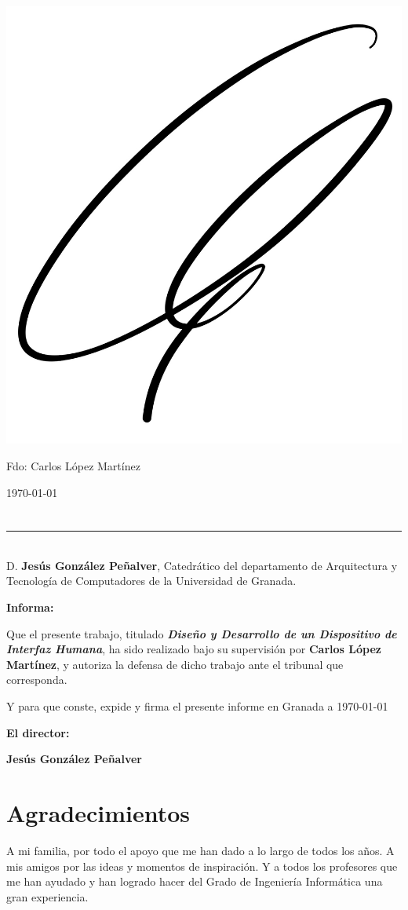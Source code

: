 \vspace{3cm}

\begin{flushleft}
       \hspace*{1.25cm}\includegraphics[width=0.2\linewidth]{prefacios/Firma.jpg}
\end{flushleft}
\noindent Fdo: Carlos López Martínez

\vspace{2cm}

\begin{flushright}
\today
\end{flushright}


\chapter*{}
\thispagestyle{empty}

\noindent\rule[-1ex]{\textwidth}{2pt}\\[4.5ex]

D. \textbf{Jesús González Peñalver}, Catedrático del departamento de Arquitectura y Tecnología de Computadores de la Universidad de Granada.

\vspace{0.5cm}

\textbf{Informa:}

\vspace{0.5cm}

Que el presente trabajo, titulado \textit{\textbf{Diseño y Desarrollo de un Dispositivo de Interfaz Humana}},
ha sido realizado bajo su supervisión por \textbf{Carlos López Martínez}, y autoriza la defensa de dicho trabajo ante el tribunal
que corresponda.

\vspace{0.5cm}

Y para que conste, expide y firma el presente informe en Granada a \today

\vspace{1cm}

\textbf{El director:}

\vspace{5cm}

\noindent \textbf{Jesús González Peñalver}

\chapter*{Agradecimientos}
\thispagestyle{empty}

       \vspace{1cm}

A mi familia, por todo el apoyo que me han dado a lo largo de todos
los años. A mis amigos por las ideas y momentos de inspiración. Y a
todos los profesores que me han ayudado y han logrado hacer del Grado de
Ingeniería Informática una gran experiencia.